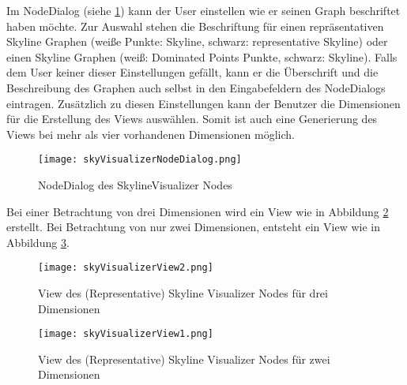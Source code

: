 Im NodeDialog (siehe \ref{img:skyVisualizerNodeDialog}) kann der User einstellen wie er seinen Graph beschriftet haben möchte. Zur Auswahl stehen die Beschriftung für einen repräsentativen Skyline Graphen (weiße Punkte: Skyline, schwarz: representative Skyline) oder einen Skyline Graphen (weiß: Dominated Points Punkte, schwarz: Skyline). Falls dem User keiner dieser Einstellungen gefällt, kann er die Überschrift und die Beschreibung des Graphen auch selbst in den Eingabefeldern des NodeDialogs eintragen. Zusätzlich zu diesen Einstellungen kann der Benutzer die Dimensionen für die Erstellung des Views auswählen. Somit ist auch eine Generierung des Views bei mehr als vier vorhandenen Dimensionen möglich.

\begin{figure}[H]
	\centering
	\texttt{[image: skyVisualizerNodeDialog.png]}
	\caption{NodeDialog des SkylineVisualizer Nodes}
	\label{img:skyVisualizerNodeDialog}
\end{figure}

Bei einer Betrachtung von drei Dimensionen wird ein View wie in Abbildung \ref{img:skyVisiualizerView2} erstellt. Bei Betrachtung von nur zwei Dimensionen, entsteht ein View wie in Abbildung \ref{img:skyVisiualizerView1}.

\begin{figure}[H]
	\centering
	\texttt{[image: skyVisualizerView2.png]}
	\caption{View des (Representative) Skyline Visualizer Nodes für drei Dimensionen}
	\label{img:skyVisiualizerView2}
\end{figure}

\begin{figure}[H]
	\centering
	\texttt{[image: skyVisualizerView1.png]}
	\caption{View des (Representative) Skyline Visualizer Nodes für zwei Dimensionen}
	\label{img:skyVisiualizerView1}
\end{figure}
